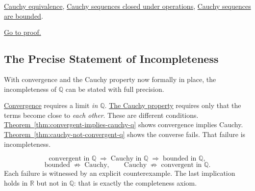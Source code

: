 \begin{remark*}[Dependencies]
\hyperref[def:cauchy-equivalence]{Cauchy equivalence},
\hyperref[thm:cauchy-closed-operations-q]{Cauchy sequences closed under operations},
\hyperref[thm:cauchy-bounded-q]{Cauchy sequences are bounded}.
\end{remark*}

\begin{remark*}[Proof]
\hyperref[prf:cauchy-equiv-preserved-operations]{Go to proof.}
\end{remark*}

\subsection{The Precise Statement of Incompleteness}
\label{subsec:incompleteness-statement-q}

\begin{remark}
With convergence and the Cauchy property now formally in place, the
incompleteness of $\mathbb{Q}$ can be stated with full precision.
\end{remark}

\begin{remark}
\hyperref[def:convergent-rational-sequence]{Convergence} requires
a limit \emph{in $\mathbb{Q}$}.
\hyperref[def:cauchy-rational]{The Cauchy property} requires only that
the terms become close to \emph{each other}.
These are different conditions.
\hyperref[thm:convergent-implies-cauchy-q]{Theorem~\ref*{thm:convergent-implies-cauchy-q}}
shows convergence implies Cauchy.
\hyperref[thm:cauchy-not-convergent-q]{Theorem~\ref*{thm:cauchy-not-convergent-q}}
shows the converse fails.
That failure is incompleteness.
\end{remark}

\begin{remark}
\[
\text{convergent in } \mathbb{Q}
\;\Longrightarrow\;
\text{Cauchy in } \mathbb{Q}
\;\Longrightarrow\;
\text{bounded in } \mathbb{Q},
\]
\[
\text{bounded}
\;\not\Longrightarrow\;
\text{Cauchy},
\qquad
\text{Cauchy}
\;\not\Longrightarrow\;
\text{convergent in } \mathbb{Q}.
\]
Each failure is witnessed by an explicit counterexample.
The last implication holds in $\mathbb{R}$ but not in $\mathbb{Q}$:
that is exactly the completeness axiom.
\end{remark}
